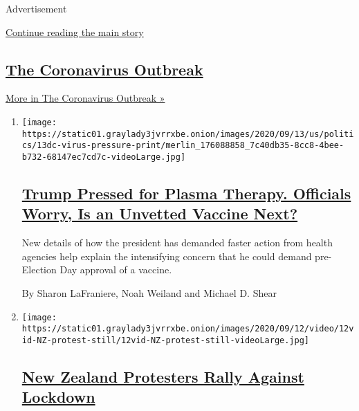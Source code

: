 Advertisement

\protect\hyperlink{after-mid1}{Continue reading the main story}

\hypertarget{the-coronavirus-outbreak}{%
\subsection{\texorpdfstring{\href{/news-event/coronavirus}{The
Coronavirus
Outbreak}}{The Coronavirus Outbreak}}\label{the-coronavirus-outbreak}}

\href{/news-event/coronavirus}{More in The Coronavirus Outbreak »}

\begin{enumerate}
\def\labelenumi{\arabic{enumi}.}
\item
  \texttt{[image: https://static01.graylady3jvrrxbe.onion/images/2020/09/13/us/politics/13dc-virus-pressure-print/merlin\_176088858\_7c40db35-8cc8-4bee-b732-68147ec7cd7c-videoLarge.jpg]}

  \hypertarget{trump-pressed-for-plasma-therapy-officials-worry-is-an-unvetted-vaccine-next}{%
  \subsection{\texorpdfstring{\href{/2020/09/12/us/politics/trump-coronavirus-treatment-vaccine.html}{Trump
  Pressed for Plasma Therapy. Officials Worry, Is an Unvetted Vaccine
  Next?}}{Trump Pressed for Plasma Therapy. Officials Worry, Is an Unvetted Vaccine Next?}}\label{trump-pressed-for-plasma-therapy-officials-worry-is-an-unvetted-vaccine-next}}

  New details of how the president has demanded faster action from
  health agencies help explain the intensifying concern that he could
  demand pre-Election Day approval of a vaccine.

  By Sharon LaFraniere, Noah Weiland and Michael D. Shear
\item
  \texttt{[image: https://static01.graylady3jvrrxbe.onion/images/2020/09/12/video/12vid-NZ-protest-still/12vid-NZ-protest-still-videoLarge.jpg]}

  \hypertarget{new-zealand-protesters-rally-against-lockdown}{%
  \subsection{\texorpdfstring{\href{/video/world/australia/100000007337546/new-zealand-coronavirus-lockdown-protest.html}{New
  Zealand Protesters Rally Against
  Lockdown}}{New Zealand Protesters Rally Against Lockdown}}\label{new-zealand-protesters-rally-against-lockdown}}


\end{enumerate}
